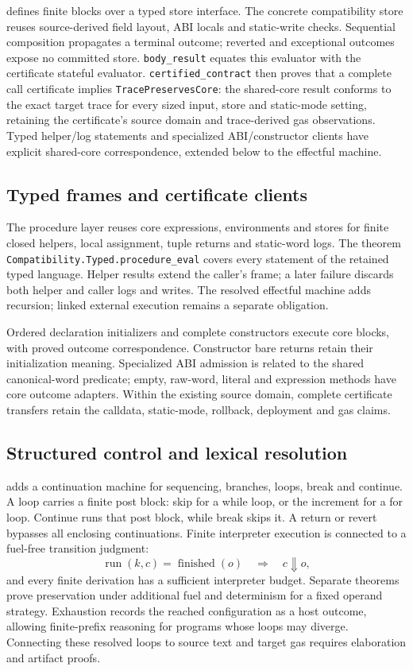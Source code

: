 \documentclass[conference]{IEEEtran}
\newcommand{\code}[1]{\texttt{#1}}
\begin{document}
 defines finite blocks over a typed store
interface. The concrete compatibility store reuses source-derived field layout,
ABI locals and static-write checks. Sequential composition propagates a terminal
outcome; reverted and exceptional outcomes expose no committed store.
\code{body\_result} equates this evaluator with the certificate stateful evaluator.
\code{certified\_contract} then proves that a complete call certificate
implies \code{TracePreservesCore}: the shared-core result conforms to the exact
target trace for every sized input, store and static-mode setting, retaining
the certificate's source domain and trace-derived gas observations.
Typed helper/log statements and specialized ABI/constructor clients have
explicit shared-core correspondence, extended below to the effectful machine.

\subsection{Typed frames and certificate clients}
The procedure layer reuses core expressions, environments and stores for
finite closed helpers, local assignment, tuple returns and static-word logs.
The theorem \code{Compatibility.Typed.procedure\_eval} covers every statement
of the retained typed language. Helper results extend the caller's frame;
a later failure discards both helper and caller logs and writes.
The resolved effectful machine adds recursion; linked external execution remains
a separate obligation.

Ordered declaration initializers and complete constructors execute core
blocks, with proved outcome correspondence. Constructor bare returns retain
their initialization meaning. Specialized ABI admission is related to the
shared canonical-word predicate; empty, raw-word, literal and expression
methods have core outcome adapters. Within the existing source domain, complete
certificate transfers retain the calldata, static-mode, rollback, deployment
and gas claims.

\subsection{Structured control and lexical resolution}
 adds a continuation machine for sequencing,
branches, loops, break and continue. A loop carries a finite post block: skip
for a while loop, or the increment for a for loop. Continue runs that post block,
while break skips it. A return or revert bypasses all enclosing continuations.
Finite interpreter execution is connected to a fuel-free transition judgment:
\[
 \operatorname{run}(k,c)=\operatorname{finished}(o)
 \quad\Longrightarrow\quad c\Downarrow o,
\]
and every finite derivation has a sufficient interpreter budget. Separate
theorems prove preservation under additional fuel and determinism for a fixed
operand strategy. Exhaustion records the reached configuration as a host outcome,
allowing finite-prefix reasoning for programs whose loops may diverge. Connecting
these resolved loops to source text and target gas requires elaboration and
artifact proofs.
\end{document}
